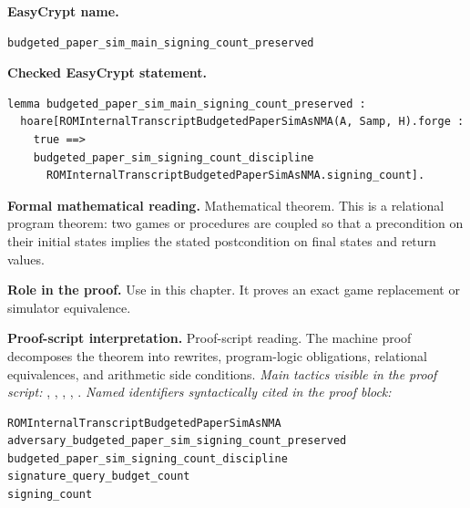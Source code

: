 \begin{formaltheorem}
\noindent\textbf{EasyCrypt name.}
\begin{lstlisting}[language=EasyCrypt,basicstyle=\ttfamily\scriptsize]
budgeted_paper_sim_main_signing_count_preserved
\end{lstlisting}
\noindent\textbf{Checked EasyCrypt statement.}
\begin{lstlisting}[language=EasyCrypt,basicstyle=\ttfamily\scriptsize]
lemma budgeted_paper_sim_main_signing_count_preserved :
  hoare[ROMInternalTranscriptBudgetedPaperSimAsNMA(A, Samp, H).forge :
    true ==>
    budgeted_paper_sim_signing_count_discipline
      ROMInternalTranscriptBudgetedPaperSimAsNMA.signing_count].
\end{lstlisting}
\noindent\textbf{Formal mathematical reading.}
Mathematical theorem. This is a relational program theorem: two games or procedures are coupled so that a precondition on their initial states implies the stated postcondition on final states and return values.

\noindent\textbf{Role in the proof.}
Use in this chapter. It proves an exact game replacement or simulator equivalence.

\noindent\textbf{Proof-script interpretation.}
Proof-script reading. The machine proof decomposes the theorem into rewrites, program-logic obligations, relational equivalences, and arithmetic side conditions.
\emph{Main tactics visible in the proof script:} , , , , .
\emph{Named identifiers syntactically cited in the proof block:}
\begin{lstlisting}[language=EasyCrypt,basicstyle=\ttfamily\scriptsize]
ROMInternalTranscriptBudgetedPaperSimAsNMA
adversary_budgeted_paper_sim_signing_count_preserved
budgeted_paper_sim_signing_count_discipline
signature_query_budget_count
signing_count
\end{lstlisting}

\end{formaltheorem}

